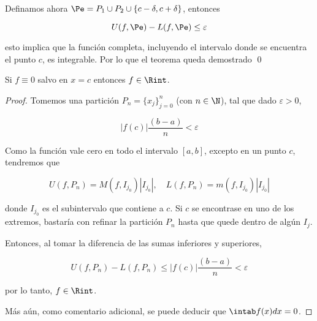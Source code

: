 Definamos ahora $\Pe = P_1 \cup P_2 \cup \{c-\delta, c+\delta\}$, entonces

\[
U(f, \Pe) - L(f, \Pe) \leq \varepsilon
\]

\noindent esto implica que la función completa, incluyendo el intervalo donde se encuentra el punto $c$, es integrable. Por lo que el teorema queda demostrado
\qed

\begin{teo}
    Si $f \equiv 0$ salvo en $x = c$ entonces $f \in \Rint$.
\end{teo}

\begin{proof}
    Tomemos una partición $P_n = \{ x_j \}_{j=0}^n$ (con $n \in \N$), tal que dado $\varepsilon > 0$,
    
    \[
    |f(c)|\frac{(b-a)}{n} < \varepsilon
    \]
    
    Como la función vale cero en todo el intervalo $[a,b]$, excepto en un punto $c$, tendremos que
    
    \[
    U(f, P_n) = M(f, I_{j_0})|I_{j_0}|, \quad L(f, P_n) = m(f, I_{j_0})|I_{j_0}|
    \]
    
    \noindent donde $I_{j_0}$ es el subintervalo que contiene a $c$. Si $c$ se encontrase en uno de los extremos, bastaría con refinar la partición $P_n$ hasta que quede dentro de algún $I_j$.
    
    Entonces, al tomar la diferencia de las sumas inferiores y superiores,
    
    \[
    U(f,P_n) - L(f,P_n) \leq |f(c)|\frac{(b-a)}{n} < \varepsilon
    \]
    
    \noindent por lo tanto, $f \in \Rint$.
    
    Más aún, como comentario adicional, se puede deducir que $\intab f(x)dx = 0$.
\end{proof}